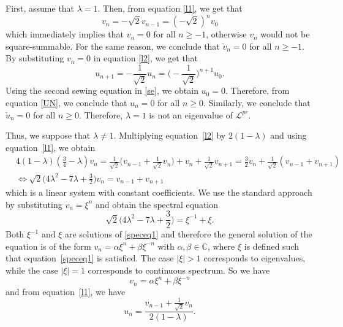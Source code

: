\documentclass[11pt]{amsart}
\newcommand{\C}{\mathbb{C}}
\theoremstyle{definition}
\theoremstyle{remark}
\theoremstyle{plain}
\numberwithin{equation}{section}
\numberwithin{lemma}{section}
\numberwithin{definition}{section}
\numberwithin{proposition}{section}
\numberwithin{corollary}{section}
\numberwithin{theorem}{section}
\numberwithin{remark}{section}
\begin{document}
First, assume that $\lambda=1$. Then, from equation \eqref{l1}, we get that 
$$
v_n=-\sqrt{2}v_{n-1}=(-\sqrt{2})^n v_0
$$
which immediately implies that $v_n=0$ for all $n\ge-1$, otherwise $v_n$ would not be square-summable. For the same reason, we conclude that $\check{v}_n=0$ for all $n\ge-1$.
By substituting $v_n=0$ in equation \eqref{l2}, we get that 
\begin{equation}
 u_{n+1}=-\frac{1}{\sqrt{2}}u_n=\Big(-\frac{1}{\sqrt{2}}\Big)^{n+1}u_0. \label{UN}
\end{equation}
Using the second sewing equation in \eqref{se}, we obtain $u_0=0$. Therefore, from equation \eqref{UN}, we conclude that $u_n=0$ for all $n\ge0$.
Similarly, we conclude that $\check{u}_n=0$ for all $n\ge0$. Therefore, $\lambda=1$ is not an eigenvalue of $\mathcal{L}^{pr}$.

Thus, we suppose that $\lambda \neq 1$. Multiplying equation~\eqref{l2} by $2(1-\lambda)$ and using equation~\eqref{l1}, we obtain
\begin{align*}
& 4(1-\lambda)(\frac{3}{4}-\lambda)v_n=\frac{1}{\sqrt{2}}\Big(v_{n-1}+\frac{1}{\sqrt{2}}v_{n}\Big)+v_{n}+\frac{1}{\sqrt{2}}v_{n+1}=\frac{3}{2}v_n+\frac{1}{\sqrt{2}}(v_{n-1}+v_{n+1}) \\
& \iff \sqrt{2}\Big(4\lambda^2-7\lambda+\frac{3}{2}\Big)v_n=v_{n-1}+v_{n+1}
\end{align*}
which is a linear system with constant coefficients. We use the standard approach by substituting $v_n=\xi^n$ and obtain the spectral equation
\begin{equation}\label{speceq1}
 \sqrt{2}\Big(4\lambda^2-7\lambda+\frac{3}{2}\Big)=\xi^{-1}+\xi.
\end{equation}
Both $\xi^{-1}$ and $\xi$ are solutions of \eqref{speceq1} and therefore the general solution of the equation is of the form $v_n=\alpha\xi^n+\beta\xi^{-n}$ with $\alpha,\beta\in\C$, where $\xi$ is defined such that equation~\eqref{speceq1} is satisfied.
The case $\vert \xi \vert>1$ corresponds to eigenvalues, while the case $\vert \xi \vert=1$ corresponds to continuous spectrum.
So we have
\begin{equation}
 v_n=\alpha \xi^n + \beta \xi^{-n}
\end{equation}
and from equation~\eqref{l1}, we have 
\begin{equation}
u_n=\frac{v_{n-1}+\frac{1}{\sqrt{2}}v_n}{2(1-\lambda)}. \label{un}
\end{equation}
 
\end{document}
